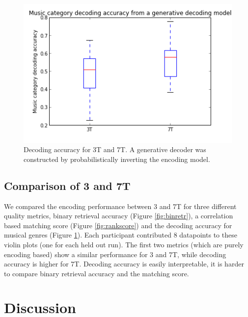  
 
 
 
\begin{figure}
	\centering
	\includegraphics[width=\linewidth]{pics/decoding_accuracy}
	\caption{Decoding accuracy for 3T and 7T. A generative decoder was constructed by probabilistically inverting the encoding model.}
	\label{fig:decoder}
\end{figure}

\subsection*{Comparison of 3 and 7T}
We compared the encoding performance between 3 and 7T for three different quality metrics, binary retrieval accuracy (Figure \ref{fig:binretr}), a correlation based matching score (Figure \ref{fig:rankscore}) and the decoding accuracy for musical genres (Figure \ref{fig:decoder}). Each participant contributed 8 datapoints to these violin plots (one for each held out run). The first two metrics (which are purely encoding based) show a similar performance for 3 and 7T, while decoding accuracy is higher for 7T. Decoding accuracy is easily interpretable, it is harder to compare binary retrieval accuracy and the matching score.     


\section*{Discussion}

